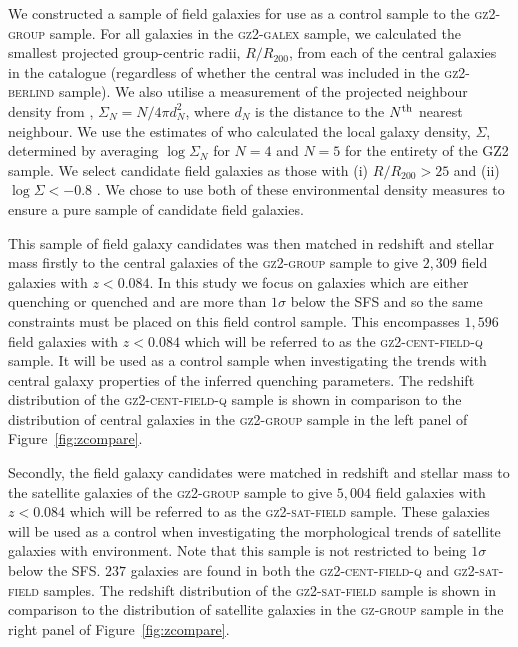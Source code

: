 \documentclass[useAMS,usenatbib]{mn2e}
\begin{document}
We constructed a sample of field galaxies for use as a control sample to the \textsc{gz2-group} sample. For all galaxies in the \textsc{gz2-galex} sample, we calculated the smallest projected group-centric radii, $R/R_{200}$, from each of the central galaxies in the \citet{berlind06} catalogue (regardless of whether the central was included in the \textsc{gz2-berlind} sample). We also utilise a measurement of the projected neighbour density from \cite{Baldry06}, $\Sigma_N = N/4\pi d_N^2$, where $d_N$ is the distance to the $N^{\rm{th}}$ nearest neighbour. We use the estimates of \cite{Bamford09} who calculated the local galaxy density, $\Sigma$, determined by averaging $\log\Sigma_N$ for $N = 4$ and $N=5$ for the entirety of the GZ2 sample. We select candidate field galaxies as those with (i) $R/R_{200} > 25$ and (ii) $\log\Sigma < -0.8$ \citep[the threshold on the local environment density which selects field galaxies as defined by][]{Baldry06}. We chose to use both of these environmental density measures to ensure a pure sample of candidate field galaxies.

This sample of field galaxy candidates was then matched in redshift and stellar mass firstly to the central galaxies of the \textsc{gz2-group} sample to give $2,309$ field galaxies with $z < 0.084$. In this study we focus on galaxies which are either quenching or quenched and are more than $1\sigma$ below the SFS and so the same constraints must be placed on this field control sample. This encompasses $1,596$ field galaxies with $z < 0.084$ which will be referred to as the \textsc{gz2-cent-field-q} sample. It will be used as a control sample when investigating the trends with central galaxy properties of the inferred quenching parameters. The redshift distribution of the \textsc{gz2-cent-field-q} sample is shown in comparison to the distribution of central galaxies in the \textsc{gz2-group} sample in the left panel of Figure~\ref{fig:zcompare}. %

Secondly, the field galaxy candidates were matched in redshift and stellar mass to the satellite galaxies of the \textsc{gz2-group} sample to give $5, 004$ field galaxies with $z < 0.084$ which will be referred to as the \textsc{gz2-sat-field} sample. These galaxies will be used as a control when investigating the morphological trends of satellite galaxies with environment. Note that this sample is not restricted to being $1\sigma$ below the SFS. $237$ galaxies are found in both the \textsc{gz2-cent-field-q} and \textsc{gz2-sat-field} samples. The redshift distribution of the \textsc{gz2-sat-field} sample is shown in comparison to the distribution of satellite galaxies in the \textsc{gz-group} sample in the right panel of Figure~\ref{fig:zcompare}.
\end{document}
